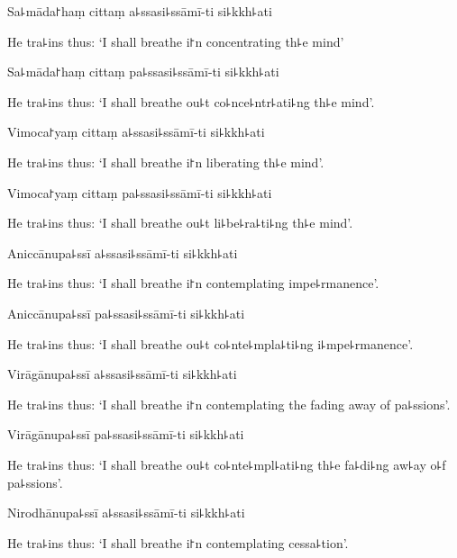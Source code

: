 Sa꜕māda꜓haṃ cittaṃ a꜕ssasi꜕ssāmī-ti si꜕kkh꜕ati

\begin{english}
  He tra꜕ins thus: `I shall breathe i꜓n concentrating th꜕e mind'
\end{english}

Sa꜕māda꜓haṃ cittaṃ pa꜕ssasi꜕ssāmī-ti si꜕kkh꜕ati

\begin{english}
  He tra꜕ins thus: `I shall breathe ou꜕t co꜕nce꜕ntr꜕ati꜕ng th꜕e mind'.
\end{english}

Vimoca꜓yaṃ cittaṃ a꜕ssasi꜕ssāmī-ti si꜕kkh꜕ati

\begin{english}
  He tra꜕ins thus: `I shall breathe i꜓n liberating th꜕e mind'.
\end{english}

Vimoca꜓yaṃ cittaṃ pa꜕ssasi꜕ssāmī-ti si꜕kkh꜕ati

\begin{english}
  He tra꜕ins thus: `I shall breathe ou꜕t li꜕be꜕ra꜕ti꜕ng th꜕e mind'.
\end{english}

Aniccānupa꜕ssī a꜕ssasi꜕ssāmī-ti si꜕kkh꜕ati

\begin{english}
  He tra꜕ins thus: `I shall breathe i꜓n contemplating impe꜕rmanence'.
\end{english}

Aniccānupa꜕ssī pa꜕ssasi꜕ssāmī-ti si꜕kkh꜕ati

\begin{english}
  He tra꜕ins thus: `I shall breathe ou꜕t co꜕nte꜕mpla꜕ti꜕ng i꜕mpe꜕rmanence'.
\end{english}

Virāgānupa꜕ssī a꜕ssasi꜕ssāmī-ti si꜕kkh꜕ati

\begin{english}
  He tra꜕ins thus: `I shall breathe i꜓n contemplating the fading away of pa꜕ssions'.
\end{english}

Virāgānupa꜕ssī pa꜕ssasi꜕ssāmī-ti si꜕kkh꜕ati

\begin{english}
  He tra꜕ins thus: `I shall breathe ou꜕t co꜕nte꜕mpl꜕ati꜕ng th꜕e fa꜕di꜕ng aw꜕ay o꜕f pa꜕ssions'.
\end{english}

Nirodhānupa꜕ssī a꜕ssasi꜕ssāmī-ti si꜕kkh꜕ati

\begin{english}
  He tra꜕ins thus: `I shall breathe i꜓n contemplating cessa꜕tion'.
\end{english}

